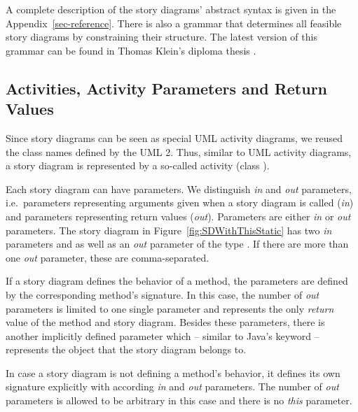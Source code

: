 A complete description of the story diagrams' abstract syntax is given in the Appendix~\ref{sec-reference}.
There is also a grammar that determines all feasible story diagrams by constraining their structure.
The latest version of this grammar can be found in Thomas Klein's diploma thesis \cite{Kle99}.



\subsection{Activities, Activity Parameters and Return Values}\label{sec:activities}

Since story diagrams can be seen as special UML activity diagrams, we reused the class names defined by the UML 2.
Thus, similar to UML activity diagrams, a story diagram is represented by a so-called activity (class ).

Each story diagram can have parameters.
We distinguish \emph{in} and \emph{out} parameters,
i.e.\ parameters representing arguments given when a story diagram is called (\emph{in})
and parameters representing return values (\emph{out}).
Parameters are either \emph{in} or \emph{out} parameters.
The story diagram in Figure~\ref{fig:SDWithThisStatic} has two \emph{in} parameters  and 
as well as an \emph{out} parameter  of the type .
If there are more than one \emph{out} parameter, these are comma-separated.

If a story diagram defines the behavior of a method, the parameters are defined by the corresponding method's signature.
In this case, the number of \emph{out} parameters is limited to one single parameter and represents the only \emph{return} value of the method and story diagram.
Besides these parameters, there is another implicitly defined parameter 
which -- similar to Java's  keyword -- represents the object that the story diagram belongs to.

In case a story diagram is not defining a method's behavior, it defines its own signature explicitly with according \emph{in} and \emph{out} parameters.
The number of \emph{out} parameters is allowed to be arbitrary in this case and there is no \emph{this} parameter.

